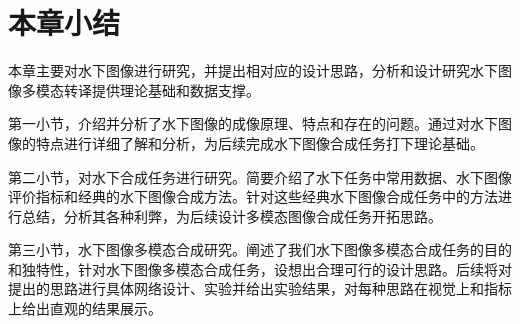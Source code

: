 \section{本章小结}
本章主要对水下图像进行研究，并提出相对应的设计思路，分析和设计研究水下图像多模态转译提供理论基础和数据支撑。

第一小节，介绍并分析了水下图像的成像原理、特点和存在的问题。通过对水下图像的特点进行详细了解和分析，为后续完成水下图像合成任务打下理论基础。

第二小节，对水下合成任务进行研究。简要介绍了水下任务中常用数据、水下图像评价指标和经典的水下图像合成方法。针对这些经典水下图像合成任务中的方法进行总结，分析其各种利弊，为后续设计多模态图像合成任务开拓思路。

第三小节，水下图像多模态合成研究。阐述了我们水下图像多模态合成任务的目的和独特性，针对水下图像多模态合成任务，设想出合理可行的设计思路。后续将对提出的思路进行具体网络设计、实验并给出实验结果，对每种思路在视觉上和指标上给出直观的结果展示。
